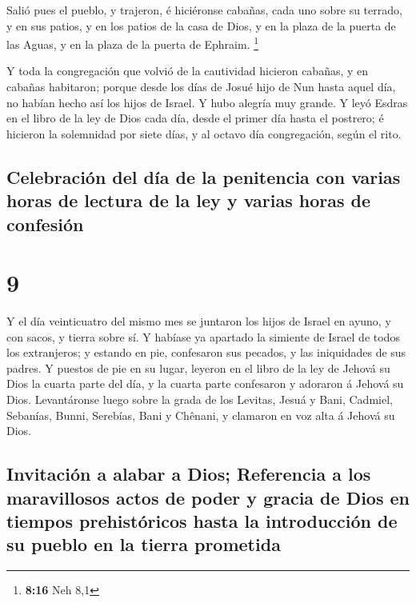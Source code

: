  Salió pues el pueblo, y trajeron, é hiciéronse cabañas,
cada uno sobre su terrado, y en sus patios, y en los patios de la casa
de Dios, y en la plaza de la puerta de las Aguas, y en la plaza de la
puerta de Ephraim. \footnote{\textbf{8:16} Neh 8,1}

 Y toda la congregación que volvió de la cautividad
hicieron cabañas, y en cabañas habitaron; porque desde los días de Josué
hijo de Nun hasta aquel día, no habían hecho así los hijos de Israel. Y
hubo alegría muy grande.  Y leyó Esdras en el libro de la
ley de Dios cada día, desde el primer día hasta el postrero; é hicieron
la solemnidad por siete días, y al octavo día congregación, según el
rito.

\hypertarget{celebraciuxf3n-del-duxeda-de-la-penitencia-con-varias-horas-de-lectura-de-la-ley-y-varias-horas-de-confesiuxf3n}{%
\subsection{Celebración del día de la penitencia con varias horas de
lectura de la ley y varias horas de
confesión}\label{celebraciuxf3n-del-duxeda-de-la-penitencia-con-varias-horas-de-lectura-de-la-ley-y-varias-horas-de-confesiuxf3n}}

\hypertarget{section-8}{%
\section{9}\label{section-8}}

 Y el día veinticuatro del mismo mes se juntaron los hijos
de Israel en ayuno, y con sacos, y tierra sobre sí.  Y
habíase ya apartado la simiente de Israel de todos los extranjeros; y
estando en pie, confesaron sus pecados, y las iniquidades de sus padres.
 Y puestos de pie en su lugar, leyeron en el libro de la ley
de Jehová su Dios la cuarta parte del día, y la cuarta parte confesaron
y adoraron á Jehová su Dios.  Levantáronse luego sobre la
grada de los Levitas, Jesuá y Bani, Cadmiel, Sebanías, Bunni, Serebías,
Bani y Chênani, y clamaron en voz alta á Jehová su Dios.

\hypertarget{invitaciuxf3n-a-alabar-a-dios-referencia-a-los-maravillosos-actos-de-poder-y-gracia-de-dios-en-tiempos-prehistuxf3ricos-hasta-la-introducciuxf3n-de-su-pueblo-en-la-tierra-prometida}{%
\subsection{Invitación a alabar a Dios; Referencia a los maravillosos
actos de poder y gracia de Dios en tiempos prehistóricos hasta la
introducción de su pueblo en la tierra
prometida}\label{invitaciuxf3n-a-alabar-a-dios-referencia-a-los-maravillosos-actos-de-poder-y-gracia-de-dios-en-tiempos-prehistuxf3ricos-hasta-la-introducciuxf3n-de-su-pueblo-en-la-tierra-prometida}}

